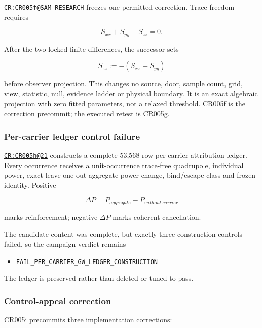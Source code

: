\texttt{CR:CR005f@SAM-RESEARCH} freezes one permitted correction. Trace
freedom requires

\[
S_{xx}+S_{yy}+S_{zz}=0.
\]

After the two locked finite differences, the successor sets

\[
S_{zz}:=-(S_{xx}+S_{yy})
\]

before observer projection. This changes no source, door, sample count,
grid, view, statistic, null, evidence ladder or physical boundary. It is
an exact algebraic projection with zero fitted parameters, not a relaxed
threshold. CR005f is the correction precommit; the executed retest is
CR005g.

\subsubsection{Per-carrier ledger control
failure}\label{viii-ch08-per-carrier-ledger-control-failure}

\href{https://github.com/iwtbotiwtwot/SAMA/blob/4c2b5dc1649da5900c90b90d0ce56c223dbb7717/tests/courtroom/21-gravitational-waves-cr005h-starbreaker-per-carrier-gw-candidate-ledger/README.md}{\texttt{CR:CR005h@21}}
constructs a complete 53,568-row per-carrier attribution ledger. Every
occurrence receives a unit-occurrence trace-free quadrupole, individual
power, exact leave-one-out aggregate-power change, bind/escape class and
frozen identity. Positive

\[
\Delta P=P_{aggregate}-P_{without\ carrier}
\]

marks reinforcement; negative \(\Delta P\) marks coherent cancellation.

The candidate content was complete, but exactly three construction
controls failed, so the campaign verdict remains

\begin{itemize}
\tightlist
\item
  \nolinkurl{FAIL_PER_CARRIER_GW_LEDGER_CONSTRUCTION}
\end{itemize}

The ledger is preserved rather than deleted or tuned to pass.

\subsubsection{Control-appeal
correction}\label{viii-ch08-control-appeal-correction}

CR005i precommits three implementation corrections:

